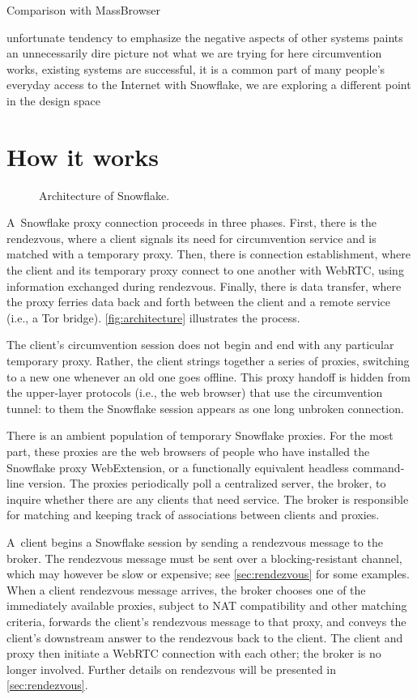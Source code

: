 \documentclass[letterpaper,twocolumn]{article}
\begin{document}
Comparison with MassBrowser~\cite{Nasr2020a}

unfortunate tendency to emphasize the negative aspects of other systems
paints an unnecessarily dire picture
not what we are trying for here
circumvention works, existing systems are successful,
it is a common part of many people's everyday access to the Internet
with Snowflake, we are exploring a different point in the design space

\section{How it works}

\begin{figure}
\caption{
Architecture of Snowflake.
}
\label{fig:architecture}
\end{figure}

A~Snowflake proxy connection proceeds in three phases.
First, there is the rendezvous, where a client
signals its need for circumvention service
and is matched with a temporary proxy.
Then, there is connection establishment,
where the client and its temporary proxy connect to one another
with WebRTC, using information exchanged during rendezvous.
Finally, there is data transfer,
where the proxy ferries data back and forth
between the client and a remote service
(i.e., a Tor bridge).
\autoref{fig:architecture}
illustrates the process.

The client's circumvention session
does not begin and end with any particular temporary proxy.
Rather, the client strings together
a series of proxies, switching to a new one
whenever an old one goes offline.
This proxy handoff is hidden from the upper-layer protocols
(i.e., the web browser) that use the circumvention tunnel:
to them the Snowflake session appears as one long unbroken connection.

There is an ambient population of temporary Snowflake proxies.
For the most part, these proxies are the web browsers of people who have
installed the Snowflake proxy WebExtension,
or a functionally equivalent headless command-line version.
The proxies periodically poll a centralized server, the broker,
to inquire whether there are any clients that need service.
The broker is responsible for matching and
keeping track of associations between clients and proxies.

A~client begins a Snowflake session by
sending a rendezvous message to the broker.
The rendezvous message must be sent over a blocking-resistant channel,
which may however be slow or expensive; see \autoref{sec:rendezvous} for some examples.
When a client rendezvous message arrives,
the broker chooses one of the immediately available proxies,
subject to NAT compatibility and other matching criteria, %
forwards the client's rendezvous message to that proxy,
and conveys the client's downstream answer to the rendezvous back to the client.
The client and proxy then initiate a WebRTC connection
with each other; the broker is no longer involved.
Further details on rendezvous will be presented in \autoref{sec:rendezvous}.
\end{document}
